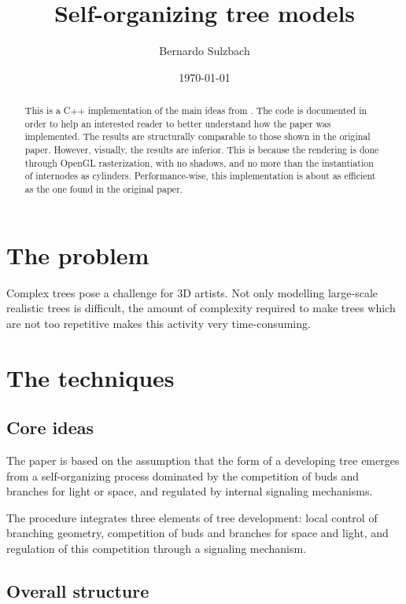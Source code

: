 \documentclass{article}
\title{Self-organizing tree models}
\author{Bernardo Sulzbach}
\date{\today}
\begin{document}
\maketitle

\begin{abstract}

This is a C++ implementation of the main ideas from \cite{Palubicki2009}.
The code is documented in order to help an interested reader to better understand how the paper was implemented.
The results are structurally comparable to those shown in the original paper.
However, visually, the results are inferior. This is because the rendering is done through OpenGL rasterization, with no shadows, and no more than the instantiation of internodes as cylinders.
Performance-wise, this implementation is about as efficient as the one found in the original paper.

\end{abstract}

\section{The problem}

Complex trees pose a challenge for 3D artists. Not only modelling large-scale realistic trees is difficult, the amount of complexity required to make trees which are not too repetitive makes this activity very time-consuming.

\section{The techniques}

\subsection{Core ideas}

The paper is based on the assumption that the form of a developing tree emerges from a self-organizing process dominated by the competition of buds and branches for light or space, and regulated by internal signaling mechanisms.

The procedure integrates three elements of tree development: local control of branching geometry, competition of buds and branches for space and light, and regulation of this competition through a signaling mechanism.

\subsection{Overall structure}
\end{document}
